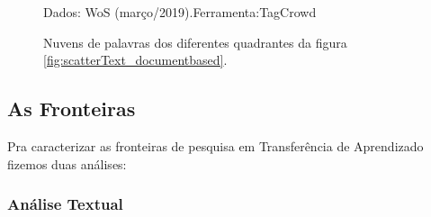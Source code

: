 \documentclass[sigconf]{acmart}
\newcommand{\source}[2]{\raggedleft{}\vspace*{-7mm}\caption*{ \textmd{\scriptsize{Dados: {#1}.\hfill Ferramenta:{#2}}}}}
\begin{document}
\begin{figure}
  \source{WoS (março/2019)}{TagCrowd}
  \caption{Nuvens de palavras dos diferentes quadrantes da figura \ref{fig:scatterText_documentbased}.} \label{fig:clouds}
\end{figure}




\subsection{As Fronteiras}\label{fronteiras}
  Pra caracterizar as fronteiras de pesquisa em Transferência de Aprendizado fizemos duas análises:
  \subsubsection{Análise Textual}
\end{document}
